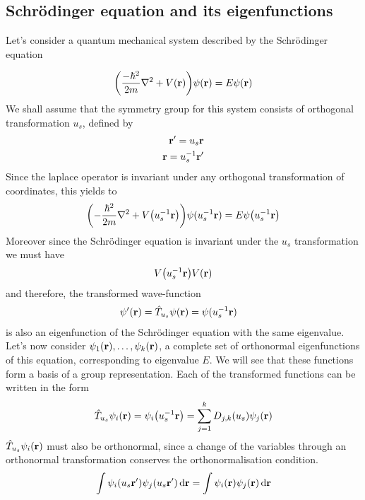 
\subsection{Schrödinger equation and its eigenfunctions} %
\label{sub:Schrödinger equation and its eigenfunctions}

Let's consider a quantum mechanical system described by the Schrödinger equation

\begin{align}
    \qty(\frac{-\hbar^2}{2m}\nabla^2+V(\vb{r}))\psi(\vb{r})=E\psi(\vb{r})
\end{align}
We shall assume that the symmetry group for this system consists of orthogonal
transformation $u_s$, defined by
\begin{align}
    \vb{r}'=u_s\vb{r}\\
    \vb{r}=u_s^{-1}\vb{r}'
\end{align}
Since the laplace operator is invariant under any orthogonal transformation of
coordinates, this yields to
\begin{align}
    \qty(-\frac{\hbar^2}{2m}\nabla^2+V\qty(u_s^{-1}\vb{r}))\psi(u_s^{-1}\vb{r})=E\psi
    \qty(u_s^{-1}\vb{r})
\end{align}
Moreover since the Schrödinger equation is invariant under the $u_s$ transformation
we must have
\begin{align}
    V\qty(u_s^{-1}\vb{r})V(\vb{r})
\end{align}
and therefore, the transformed wave-function
\begin{align}
    \psi'(\vb{r})&=\hat{T}_{u_s}\psi(\vb{r})=\psi(u_s^{-1}\vb{r})
\end{align}
is also an eigenfunction of the Schrödinger equation with the same eigenvalue.
Let's now consider $\psi_1(\vb{r}),\dots,\psi_k(\vb{r})$, a complete set of
orthonormal eigenfunctions of this equation, corresponding to eigenvalue $E$. We
will see that these functions form a basis of a group representation.
Each of the transformed functions can be written in the form
\begin{align}
    \hat{T}_{u_s}\psi_i(\vb{r})=\psi_i\qty(u^{-1}_s\vb{r})=\sum_{j=1}^kD_{j,k}
    (u_s)\psi_j(\vb{r})
\end{align}
$\hat{T}_{u_s}\psi_i(\vb{r})$ must also be orthonormal, since a change of the variables through an orthonormal transformation conserves the
orthonormalisation condition.
\begin{align}
    \int\psi_i(u_s\vb{r}')\psi_j(u_s\vb{r}')\dd{\vb{r}}=
    \int\psi_i(\vb{r})\psi_j(\vb{r})\dd{\vb{r}}
\end{align}
